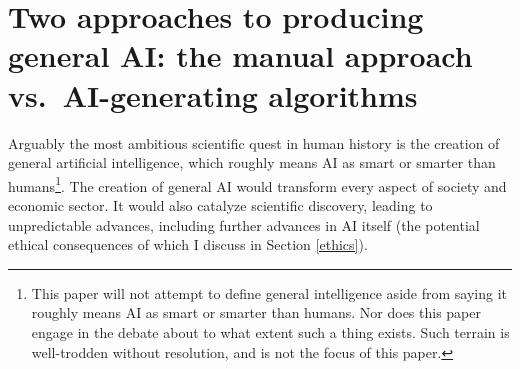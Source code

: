 \documentclass{article}
\begin{document}
\section{Two approaches to producing general AI: the manual approach vs.\ AI-generating algorithms}

Arguably the most ambitious scientific quest in human history is the creation of general artificial intelligence, which roughly means AI as smart or smarter than humans\footnote{This paper will not attempt to define general intelligence aside from saying it roughly means AI as smart or smarter than humans. Nor does this paper engage in the debate about to what extent such a thing exists. Such terrain is well-trodden without resolution, and is not the focus of this paper.}. The creation of general AI would transform every aspect of society and economic sector. It would also catalyze scientific discovery, leading to unpredictable advances, including further advances in AI itself (the potential ethical consequences of which I discuss in Section \ref{ethics}). 
\end{document}
